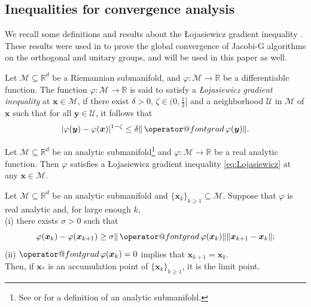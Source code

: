 \documentclass[final,onefignum,onetabnum]{siamart190516}
\makeatletter
\newcommand{\vect}[1]{\boldsymbol{#1}}
\newcommand{\ProjGrad}[2]{\mathop{{\operator@font grad} }#1(#2)}
\newcommand{\RR}{\mathbb{R}}
\makeatother
\begin{document}
\subsection{Inequalities for convergence analysis}\label{sec:inequalities}
We recall some definitions and results about the \L{}ojasiewicz gradient inequality \cite{loja1965ensembles,lojasiewicz1993geometrie,absil2005convergence,Usch15:pjo}. 
These results were used in \cite{LUC2018,ULC2019} to prove the global convergence of Jacobi-G algorithms on the orthogonal and unitary groups, and will be used in this paper as well. 

\begin{definition} \label{def:Lojasiewicz}
Let $\mathcal{M} \subseteq \RR^d$ be a Riemannian submanifold,
and $\varphi: \mathcal{M} \to \RR$ be a differentiable function.
The function $\varphi: \mathcal{M} \to \RR$ is said to satisfy a \emph{\L{}ojasiewicz gradient inequality} at $\vect{x} \in \mathcal{M}$, if there exist
$\delta>0$, $\zeta\in (0,\frac{1}{2}]$ and a neighborhood $\mathcal{U}$ in $\mathcal{M}$ of $\vect{x}$ such that for all $\vect{y}\in\mathcal{U}$, it follows that 
\begin{equation}\label{eq:Lojasiewicz}
|{\varphi}(\vect{y})-{\varphi}(\vect{x})|^{1-\zeta}\leq \delta\|\ProjGrad{\varphi}{\vect{y}}\|.
\end{equation}
\end{definition}

\begin{lemma}\label{lemma-SU15}
Let $\mathcal{M}\subseteq\RR^d$ be an analytic submanifold\footnote{See {\cite[Definition 2.7.1]{krantz2002primer}} or \cite[Definition 5.1]{LUC2018} for a definition of an analytic submanifold.} and $\varphi: \mathcal{M} \to \RR$ be a real analytic function.
Then $\varphi$ satisfies a \L{}ojasiewicz gradient inequality \cref{eq:Lojasiewicz} at any $\vect{x}\in \mathcal{M}$. 	
\end{lemma}


\begin{theorem}\label{theorem-SU15}
Let $\mathcal{M}\subseteq\RR^d$ be an analytic submanifold
and 
$\{\vect{x}_k\}_{k\geq 1}\subseteq\mathcal{M}$.
Suppose that $\varphi$ is real analytic and, for large enough $k$,\\
(i) there exists $\sigma>0$ such that
\begin{equation*}
\varphi(\vect{x}_{k})-{\varphi}(\vect{x}_{k+1})\geq \sigma\|\ProjGrad{\varphi}{\vect{x}_k}\|\|\vect{x}_{k+1}-\vect{x}_{k}\|;
\end{equation*}
(ii) $\ProjGrad{\varphi}{\vect{x}_k}=0$ implies that $\vect{x}_{k+1}=\vect{x}_{k}$.\\
Then, if $\vect{x}_*$ is an accumulation point of $\{\vect{x}_k\}_{k\geq 1}$, it is the limit point. 
\end{theorem}
\end{document}
